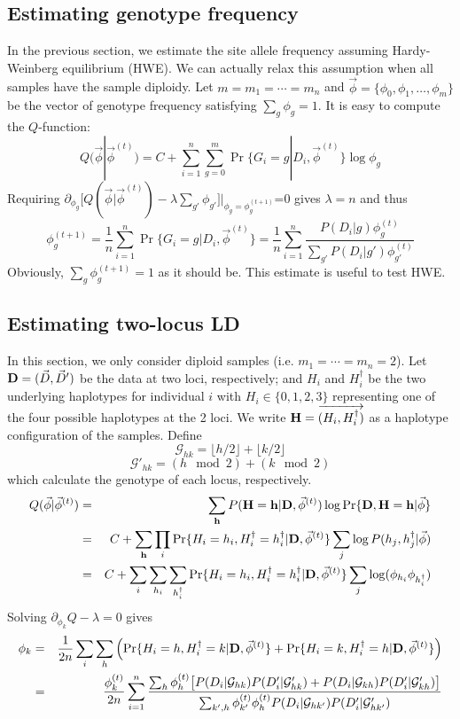 \documentclass[pdftex,10pt]{book}
\begin{document}
\subsection{Estimating genotype frequency}
In the previous section, we estimate the site allele frequency assuming Hardy-Weinberg equilibrium (HWE).
We can actually relax this assumption when all samples have the sample diploidy.
Let $m=m_1=\cdots=m_n$ and $\vec{\phi}=\{\phi_0,\phi_1,\ldots,\phi_m\}$ be the vector of
genotype frequency satisfying $\sum_g\phi_g=1$. It is easy to compute the $Q$-function:
$$
Q(\vec{\phi}|\vec{\phi}^{(t)})=C+\sum_{i=1}^n\sum_{g=0}^m\Pr\{G_i=g|D_i,\vec{\phi}^{(t)}\}\log\phi_g
$$
Requiring $\partial_{\phi_g}\big[Q(\vec{\phi}|\vec{\phi}^{(t)})-\lambda\sum_{g'}\phi_{g'}\big]\Big|_{\phi_g=\phi_g^{(t+1)}}$=0 gives $\lambda=n$
and thus
$$
\phi_g^{(t+1)}=\frac{1}{n}\sum_{i=1}^n\Pr\{G_i=g|D_i,\vec{\phi}^{(t)}\}=\frac{1}{n}\sum_{i=1}^n\frac{P(D_i|g)\phi_g^{(t)}}{\sum_{g'}P(D_i|g')\phi_{g'}^{(t)}}
$$
Obviously, $\sum_g\phi_g^{(t+1)}=1$ as it should be. This estimate is useful to test HWE.

\subsection{Estimating two-locus LD}
In this section, we only consider diploid samples
(i.e. $m_1=\cdots=m_n=2$). Let ${\bf D}=(\vec{D},\vec{D}')$ be the data
at two loci, respectively; and $H_i$ and $H^{\dag}_i$ be the two
underlying haplotypes for individual $i$ with $H_i\in\{0,1,2,3\}$
representing one of the four possible haplotypes at the 2 loci. We write
${\bf H}=\overrightarrow{(H_i,H^{\dag}_i)}$ as a haplotype configuration of the
samples. Define
$$
\mathcal{G}_{hk}=\lfloor h/2\rfloor+\lfloor k/2\rfloor
$$
$$
\mathcal{G}'_{hk}=(h\mod 2)+(k\mod 2)
$$
which calculate the genotype of each locus, respectively.
\begin{eqnarray*}
  Q(\vec{\phi}|\vec{\phi}^{(t)})&=&\sum_{\bf h}P({\bf H}={\bf h}|{\bf D},\vec{\phi}^{(t)})\log\Pr\{{\bf D},{\bf H}={\bf h}|\vec{\phi}\}\\
  &=&C+\sum_{\bf h}\prod_i\Pr\{H_i=h_i,H^{\dag}_i=h^{\dag}_i|{\bf D},\vec{\phi}^{(t)}\}\sum_j\log P(h_j,h^{\dag}_j|\vec{\phi})\\
  &=&C+\sum_i\sum_{h_i}\sum_{h^{\dag}_i}\Pr\{H_i=h_i,H^{\dag}_i=h^{\dag}_i|{\bf D},\vec{\phi}^{(t)}\}\sum_j\log(\phi_{h_i}\phi_{h^{\dag}_i})
\end{eqnarray*}
Solving $\partial_{\phi_k}Q-\lambda=0$ gives
\begin{eqnarray*}
\phi_k&=&\frac{1}{2n}\sum_i\sum_h\left(\Pr\{H_i=h,H^{\dag}_i=k|{\bf D},\vec{\phi}^{(t)}\}+\Pr\{H_i=k,H^{\dag}_i=h|{\bf D},\vec{\phi}^{(t)}\}\right)\\
&=&\frac{\phi^{(t)}_k}{2n}\sum_{i=1}^n\frac{\sum_{h}\phi^{(t)}_h\big[P(D_i|{\cal G}_{hk})P(D'_i|{\cal G}'_{hk})+P(D_i|{\cal G}_{kh})P(D'_i|{\cal G}'_{kh})\big]}{\sum_{k',h}\phi^{(t)}_{k'}\phi^{(t)}_hP(D_i|{\cal G}_{hk'})P(D'_i|{\cal G}'_{hk'})}
\end{eqnarray*}
\end{document}
